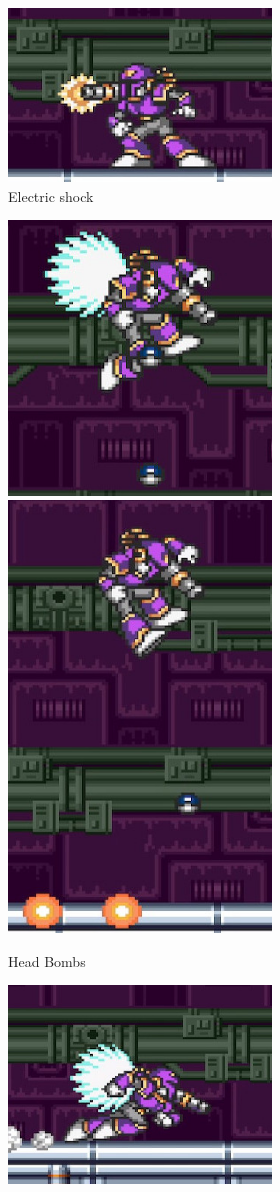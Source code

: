 \begin{figure}[htp]
\begin{figure}[htp]
\begin{subfigure}{\linewidth}
		\centering
		\includegraphics[width=0.4\linewidth]{figures/X1/Sigma_stages/Vile_cannon_1.jpg}
		\caption{Electric shock}
	\end{subfigure}
	\begin{subfigure}{\linewidth}
		\centering
		\includegraphics[width=0.32\linewidth]{figures/X1/Sigma_stages/Vile_bomb_1.jpg}
		\includegraphics[width=0.20\linewidth]{figures/X1/Sigma_stages/Vile_bomb_2.jpg}
		\caption{Head Bombs}
	\end{subfigure}
	\begin{subfigure}[t]{0.4\linewidth}
		\centering
		\includegraphics[width=\linewidth]{figures/X1/Sigma_stages/Vile_dash.jpg}

\end{subfigure}
\end{figure}
\end{figure}
